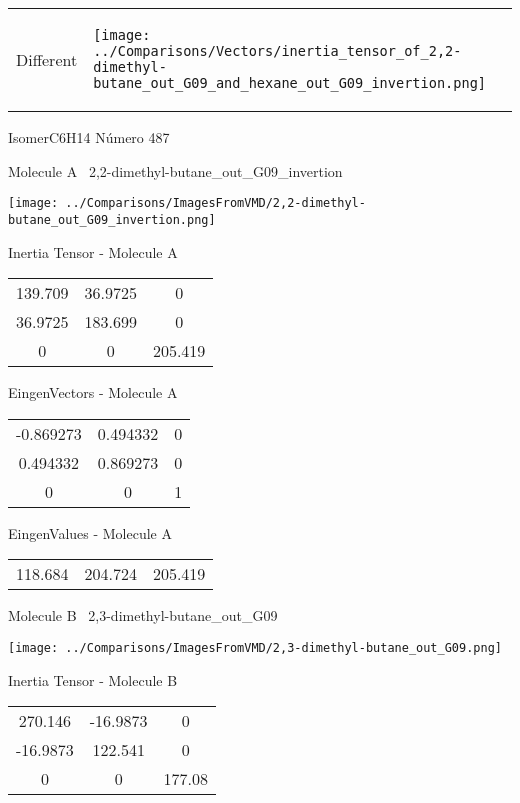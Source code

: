 \vtab[-5mm]
\begin{tabular}{*{2}{m{}}}
\begin{center}
\textcolor{NavyBlue}{\Large Different}
\end{center}
&
\begin{center}
\texttt{[image: ../Comparisons/Vectors/inertia\_tensor\_of\_2,2-dimethyl-butane\_out\_G09\_and\_hexane\_out\_G09\_invertion.png]}
\end{center}
\end{tabular}

 \newpage

\vtab[-3cm]
\begin{center}
{\large IsomerC6H14 \tab Número 487}
\end{center}
\begin{multicols}{2}
\begin{center}

Molecule A \
2,2-dimethyl-butane\_out\_G09\_invertion

\texttt{[image: ../Comparisons/ImagesFromVMD/2,2-dimethyl-butane\_out\_G09\_invertion.png]}

Inertia Tensor - Molecule A \\
\begin{tabular}{|c c c|}
139.709	 & 	36.9725	 & 	0	 \\
36.9725	 & 	183.699	 & 	0	 \\
0	 & 	0	 & 	205.419
\end{tabular}

\vtab
 EingenVectors - Molecule A     \\
\begin{tabular}{|c c c|}
-0.869273	 & 	0.494332	 & 	0	 \\
0.494332	 & 	0.869273	 & 	0	 \\
0	 & 	0	 & 	1
\end{tabular}

\vtab
 EingenValues - Molecule A     \\
\begin{tabular}{|c c c|}
118.684	 & 	204.724	 & 	205.419	 \\
\end{tabular}
\columnbreak

Molecule B \
2,3-dimethyl-butane\_out\_G09

\texttt{[image: ../Comparisons/ImagesFromVMD/2,3-dimethyl-butane\_out\_G09.png]}

Inertia Tensor - Molecule B \\
\begin{tabular}{|c c c|}
270.146	 & 	-16.9873	 & 	0	 \\
-16.9873	 & 	122.541	 & 	0	 \\
0	 & 	0	 & 	177.08
\end{tabular}


\end{center}
\end{multicols}
